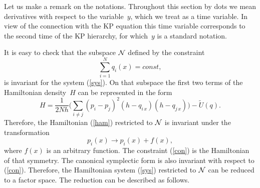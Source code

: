 \documentclass[a4paper,11pt]{article}
\newcommand{\wt}{\widetilde}
\theoremstyle{plain}
\theoremstyle{remark}
\begin{document}
Let us make a remark on the notations. Throughout this section by dots
we mean derivatives with respect to the variable~$y$, which we treat as
a time variable.
In view of the connection with the KP equation this time variable
corresponds to the second time of the KP hierarchy, for which~$y$ is
a standard notation.

It is easy to check that the subspace $\cal N$ defined by the constraint
\begin{equation}\label{con}
\sum_{i=1}^N q_i(x)=const ,
\end{equation}
is invariant for the system (\ref{sys}).
On that subspace the first two terms of the Hamiltonian density~$H$ can be
represented in the form
\begin{equation}
H=\frac{1}{2Nh}\biggl(\sum_{i\ne j} (p_i-p_j)^2 (h-q_{i\,x})(h-q_{j\,x})
\biggr) -\wt U(q) .
\end{equation}
Therefore, the Hamiltonian (\ref{ham}) restricted to ${\cal N}$ is invariant
under the transformation
\begin{equation}\label{psym}
p_i(x)\to p_i(x)+f(x),
\end{equation}
where $f(x)$ is an arbitrary function.
The constraint (\ref{con}) is the Hamiltonian of that symmetry. The canonical
symplectic form is also invariant with respect to (\ref{con}). Therefore, the
Hamiltonian system (\ref{sys}) restricted to $\cal N$ can be reduced to a
factor space. The reduction can be described as follows.
\end{document}
